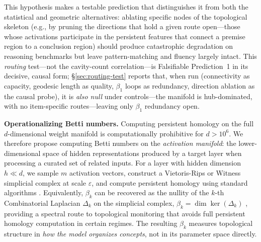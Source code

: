 \documentclass{article}
\begin{document}
This hypothesis makes a testable prediction that distinguishes it from both the statistical and geometric alternatives: ablating specific nodes of the topological skeleton (e.g., by pruning the directions that hold a given route open---those whose activations participate in the persistent features that connect a premise region to a conclusion region) should produce catastrophic degradation on reasoning benchmarks but leave pattern-matching and fluency largely intact. This \emph{routing} test---not the cavity-count correlation---is Falsifiable Prediction~1 in its decisive, causal form; \S\ref{sec:routing-test} reports that, when run (connectivity as capacity, geodesic length as quality, $\beta_1$ loops as redundancy, direction ablation as the causal probe), it is \emph{also null} under controls---the manifold is hub-dominated, with no item-specific routes---leaving only $\beta_1$ redundancy open.

\medskip
\noindent\textbf{Operationalizing Betti numbers.}
Computing persistent homology on the full $d$-dimensional weight manifold is computationally prohibitive for $d > 10^6$. We therefore propose computing Betti numbers on the \emph{activation manifold}: the lower-dimensional space of hidden representations produced by a target layer when processing a curated set of related inputs. For a layer with hidden dimension $h \ll d$, we sample $m$ activation vectors, construct a Vietoris-Rips or Witness simplicial complex at scale $\varepsilon$, and compute persistent homology using standard algorithms \citep{Carlsson2009topology,otter2017roadmap}. Equivalently, $\beta_k$ can be recovered as the nullity of the $k$-th Combinatorial Laplacian $\Delta_k$ on the simplicial complex, $\beta_k = \dim \ker(\Delta_k)$ \citep{Memoli2022persistent}, providing a spectral route to topological monitoring that avoids full persistent homology computation in certain regimes. The resulting $\beta_k$ measures topological structure in \emph{how the model organizes concepts}, not in its parameter space directly.
\end{document}
